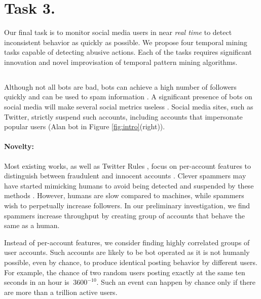 


\section{Task 3. \Tone}


Our final task is to monitor social media users in near {\it real time} to detect inconsistent behavior as quickly as possible. We propose four temporal mining tasks capable of detecting abusive actions. Each of the tasks requires significant innovation and novel improvisation of temporal pattern mining algorithms. 


\subsection{\Toneone}

Although not all bots are bad, bots can achieve a high number of followers quickly and can be used to spam information \cite{BotFools}. A significant presence of bots on social media will make several social metrics useless \cite{Asur2010}. Social media sites, such as Twitter, strictly suspend such accounts, including accounts that impersonate popular users \cite{Twitter} (Alan bot in Figure \ref{fig:intro}(right)).

\paragraph{Novelty:} Most existing works, as well as Twitter Rules \cite{Twitter}, focus on per-account features to distinguish between fraudulent and innocent accounts \cite{Aggarwal:2013,Thomas:11,Zhang:11}. Clever spammers may have started mimicking humans to avoid being detected and suspended by these methods \cite{Danezis2009}. However, humans are slow compared to machines, while spammers wish to perpetually increase followers. In our preliminary investigation, we find spammers increase throughput by creating group of accounts that behave the same as a human. 


Instead of per-account features, we consider finding highly correlated groups of user accounts. Such accounts are likely to be bot operated as it is not humanly possible, even by chance, to produce identical posting behavior by different users. For example, the chance of two random users posting exactly at the same ten seconds in an hour is $~3600^{-10}$. Such an event can happen by chance only if there are more than a trillion active users.

